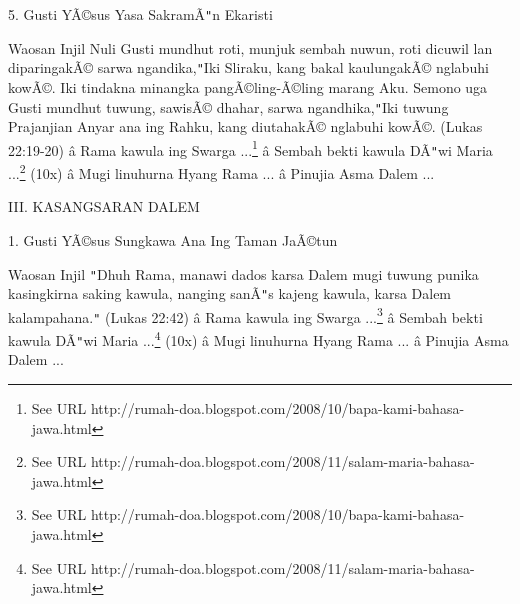 
5. Gusti Y\~A\copyright{}sus Yasa Sakram\~A\texttt{{}"{}}n Ekaristi

\newline


Waosan Injil
Nuli Gusti mundhut roti, munjuk sembah nuwun, roti dicuwil lan diparingak\~A\copyright{} sarwa ngandika,\texttt{{}"{}}Iki Sliraku, kang bakal kaulungak\~A\copyright{} nglabuhi kow\~A\copyright{}. Iki tindakna minangka pang\~A\copyright{}ling-\~A\copyright{}ling marang Aku. Semono uga Gusti mundhut tuwung, sawis\~A\copyright{} dhahar, sarwa ngandhika,\texttt{{}"{}}Iki tuwung Prajanjian Anyar ana ing Rahku, kang diutahak\~A\copyright{} nglabuhi kow\~A\copyright{}. (Lukas 22:19-20)
\newline
 \^a\*  Rama kawula ing Swarga ...\footnote{See URL http://rumah-doa.blogspot.com/2008/10/bapa-kami-bahasa-jawa.html}\newline
 \^a\*  Sembah bekti kawula D\~A\texttt{{}"{}}wi Maria ...\footnote{See URL http://rumah-doa.blogspot.com/2008/11/salam-maria-bahasa-jawa.html} (10x)\newline
 \^a\*  Mugi linuhurna Hyang Rama ...\newline
 \^a\*  Pinujia Asma Dalem ...\newline

III. KASANGSARAN DALEM
\newline


1. Gusti Y\~A\copyright{}sus Sungkawa Ana Ing Taman Ja\~A\copyright{}tun

\newline


Waosan Injil
\texttt{{}"{}}Dhuh Rama, manawi dados karsa Dalem mugi tuwung punika kasingkirna saking kawula, nanging san\~A\texttt{{}"{}}s kajeng kawula, karsa Dalem kalampahana.\texttt{{}"{}} (Lukas 22:42)
\newline
 \^a\*  Rama kawula ing Swarga ...\footnote{See URL http://rumah-doa.blogspot.com/2008/10/bapa-kami-bahasa-jawa.html}\newline
 \^a\*  Sembah bekti kawula D\~A\texttt{{}"{}}wi Maria ...\footnote{See URL http://rumah-doa.blogspot.com/2008/11/salam-maria-bahasa-jawa.html} (10x)\newline
 \^a\*  Mugi linuhurna Hyang Rama ...\newline
 \^a\*  Pinujia Asma Dalem ...\newline

